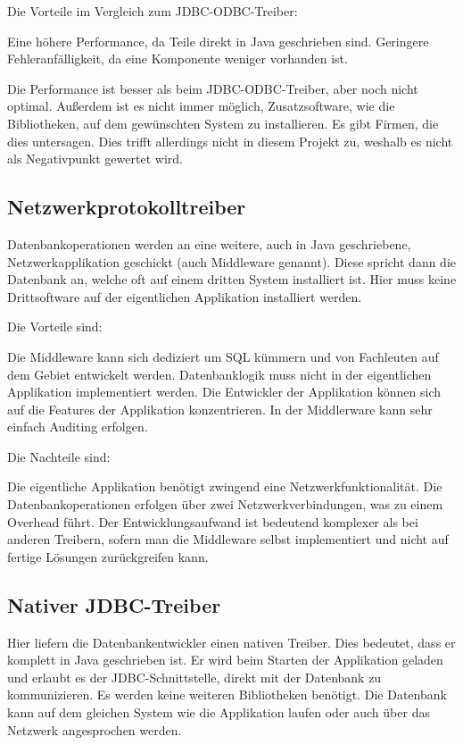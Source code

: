 Die Vorteile im Vergleich zum JDBC\hyp{}ODBC\hyp{}Treiber:

\begin{outline}
  \1 Eine höhere Performance, da Teile direkt in Java geschrieben sind.
  \1 Geringere Fehleranfälligkeit, da eine Komponente weniger vorhanden ist.
\end{outline}

Die Performance ist besser als beim JDBC\hyp{}ODBC\hyp{}Treiber, aber noch
nicht optimal.  Außerdem ist es nicht immer möglich, Zusatzsoftware, wie die
Bibliotheken, auf dem gewünschten System zu installieren. Es gibt Firmen, die
dies untersagen.  Dies trifft allerdings nicht in diesem Projekt zu, weshalb es
nicht als Negativpunkt gewertet wird.
\tm%

\subsection{Netzwerkprotokolltreiber}
Datenbankoperationen werden an eine weitere, auch in Java geschriebene,
Netzwerkapplikation geschickt (auch \gls{Middleware} genannt). Diese spricht
dann die Datenbank an, welche oft auf einem dritten System installiert ist.
Hier muss keine Drittsoftware auf der eigentlichen Applikation installiert
werden.

Die Vorteile sind:

\begin{outline}
  \1 Die Middleware kann sich dediziert um SQL kümmern und von Fachleuten auf
  dem Gebiet entwickelt werden.
  \1 Datenbanklogik muss nicht in der eigentlichen Applikation implementiert
  werden. Die Entwickler der Applikation können sich auf die Features der
  Applikation konzentrieren.
  \1 In der Middlerware kann sehr einfach Auditing erfolgen.
\end{outline}

Die Nachteile sind:

\begin{outline}
  \1 Die eigentliche Applikation benötigt zwingend eine Netzwerkfunktionalität.
  \1 Die Datenbankoperationen erfolgen über zwei Netzwerkverbindungen, was
  zu einem Overhead führt.
  \1 Der Entwicklungsaufwand ist bedeutend komplexer als bei anderen Treibern,
  sofern man die Middleware selbst implementiert und nicht auf fertige Lösungen
  zurückgreifen kann.
\end{outline}
\tm%

\subsection{Nativer JDBC-Treiber}
Hier liefern die Datenbankentwickler einen nativen Treiber. Dies bedeutet, dass
er komplett in Java geschrieben ist. Er wird beim Starten der Applikation
geladen und erlaubt es der JDBC\hyp{}Schnittstelle, direkt mit der Datenbank zu
kommunizieren. Es werden keine weiteren Bibliotheken benötigt. Die Datenbank
kann auf dem gleichen System wie die Applikation laufen oder auch über das
Netzwerk angesprochen werden.

